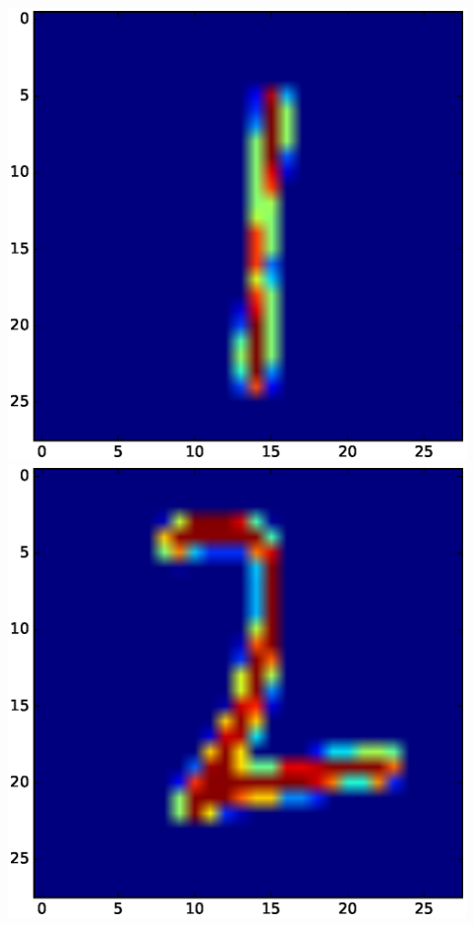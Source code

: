 \documentclass{article}
\begin{document}
\includegraphics[scale=.1]{fig/MNIST119.eps}
\includegraphics[scale=.1]{fig/MNIST121.eps}
\end{document}
